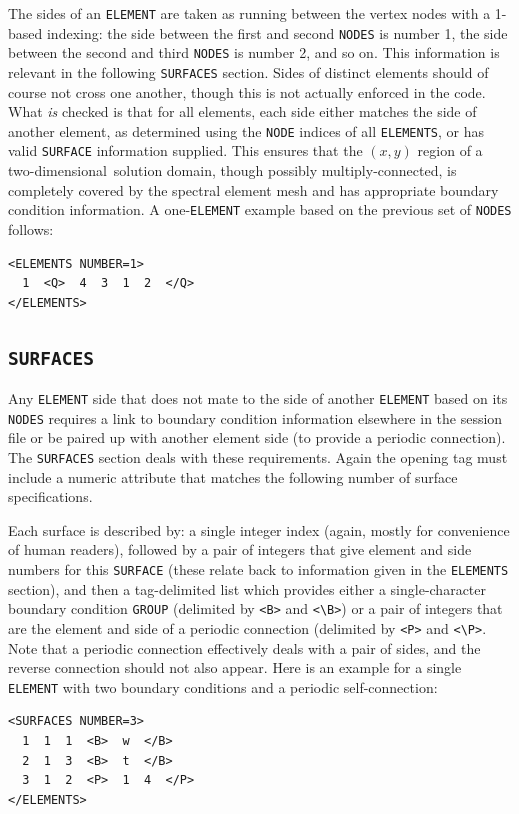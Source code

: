 \documentclass[11pt]{report}
\newcommand\twod{two-di\-men\-sion\-al}
\begin{document}
The sides of an \verb|ELEMENT| are taken as running between the vertex
nodes with a 1-based indexing: the side between the first and second
\verb|NODES| is number 1, the side between the second and third
\verb|NODES| is number 2, and so on.  This information is relevant in
the following \verb|SURFACES| section. Sides of distinct elements
should of course not cross one another, though this is not actually
enforced in the code.  What \emph{is} checked is that for all
elements, each side either matches the side of another element, as
determined using the \verb|NODE| indices of all \verb|ELEMENTS|, or
has valid \verb|SURFACE| information supplied.  This ensures that the
$(x,y)$ region of a \twod\ solution domain, though possibly
multiply-connected, is completely covered by the spectral element mesh
and has appropriate boundary condition information.  A
one-\verb|ELEMENT| example based on the previous set of \verb|NODES|
follows:
%
{\small
\begin{verbatim}
<ELEMENTS NUMBER=1>
  1  <Q>  4  3  1  2  </Q>
</ELEMENTS>
\end{verbatim}
}

\subsection{\texttt{SURFACES}}
\label{sec.surfaces}

Any \verb|ELEMENT| side that does not mate to the side of another
\verb|ELEMENT| based on its \verb|NODES| requires a link to boundary
condition information elsewhere in the session file or be paired up
with another element side (to provide a periodic connection).  The
\verb|SURFACES| section deals with these requirements.  Again the
opening tag must include a numeric attribute that matches the
following number of surface specifications.

Each surface is described by: a single integer index (again, mostly for
convenience of human readers), followed by a pair of integers that
give element and side numbers for this \verb|SURFACE| (these relate
back to information given in the \verb|ELEMENTS| section), and then a
tag-delimited list which provides either a single-character boundary
condition \verb|GROUP| (delimited by \verb|<B>| and \verb|<\B>|) or a
pair of integers that are the element and side of a periodic
connection (delimited by \verb|<P>| and \verb|<\P>|.  Note that a
periodic connection effectively deals with a pair of sides, and the
reverse connection should not also appear.  Here is an example for a
single \verb|ELEMENT| with two boundary conditions and a periodic
self-connection:
%
{\small
\begin{verbatim}
<SURFACES NUMBER=3>
  1  1  1  <B>  w  </B>
  2  1  3  <B>  t  </B>
  3  1  2  <P>  1  4  </P>
</ELEMENTS>
\end{verbatim}
}
\end{document}

